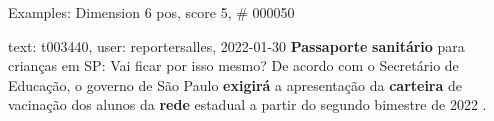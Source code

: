 \begin{frame}{Examples: Dimension 6 pos, score 5, \# 000050}
\footnotesize
\begin{exampleblock}{text: t003440, user: reportersalles, 2022-01-30}
\textbf{Passaporte} \textbf{sanitário} para crianças em SP: Vai ficar por isso 
mesmo? De acordo com o Secretário de Educação, o governo de São Paulo 
\textbf{exigirá} a apresentação da \textbf{carteira} de vacinação dos alunos da 
\textbf{rede} estadual a partir do segundo bimestre de 2022 . 
\end{exampleblock}
\end{frame}

